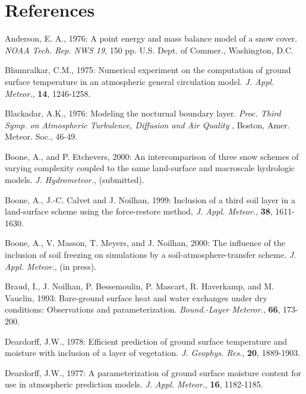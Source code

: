 \section{References}

\begin{description}

\item
Anderson, E. A., 1976:
A point energy and mass balance model of a snow cover.
{\it NOAA Tech. Rep. NWS 19}, 150 pp. U.S. Dept. of
Commer., Washington, D.C.

\item
Bhumralkar, C.M., 1975:
Numerical experiment on the computation of ground surface
temperature in an atmospheric general circulation model.
{\em J. Appl. Meteor.}, {\bf 14}, 1246-1258.

\item
Blackadar, A.K., 1976:
Modeling the nocturnal boundary layer.
{\em Proc. Third Symp. on Atmospheric Turbulence,
Diffusion and Air Quality }, Boston, Amer. Meteor. Soc., 46-49.

\item
Boone, A.,
and P. Etchevers, 2000:
An intercomparison of three snow schemes of varying complexity
coupled to the same land-surface and macroscale hydrologic models.
{\em J. Hydrometeor.},
(submitted).

\item
Boone, A.,
J.-C. Calvet and J. Noilhan, 1999:
Inclusion of a third soil layer in a
land-surface scheme using the force-restore method,
{\em J. Appl. Meteor.},
{\bf 38},
1611-1630.

\item
Boone, A.,
V. Masson, T. Meyers, and J. Noilhan, 2000:
The influence of the inclusion of soil freezing
on simulations by a soil-atmosphere-transfer scheme.
{\em J. Appl. Meteor.},
(in press).

\item
Braud, I., J. Noilhan, P. Bessemoulin, P. Mascart, R. Haverkamp,
and M. Vauclin, 1993:
Bare-ground surface heat and water exchanges under dry conditions:
Observations and parameterization.
{\em Bound.-Layer Meteror.},
{\bf 66},
173-200.

\item
Deardorff, J.W., 1978:
Efficient prediction of ground surface temperature and moisture
with inclusion of a layer of vegetation.
{\em J. Geophys. Res.},
{\bf 20},
1889-1903.

\item
Deardorff, J.W., 1977:
A parameterization of ground surface moisture content for
use in atmospheric prediction models.
{\em J. Appl. Meteor.},
{\bf 16},
1182-1185.


\end{description}
